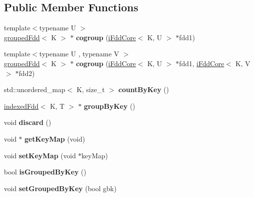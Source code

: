 \subsection*{Public Member Functions}
\begin{DoxyCompactItemize}
\item 
\hypertarget{classfaster_1_1iFddCore_a311cd5a470392a25565057aaf0fa3226}{}{\footnotesize template$<$typename U $>$ }\\\hyperlink{classfaster_1_1groupedFdd}{grouped\+Fdd}$<$ K $>$ $\ast$ {\bfseries cogroup} (\hyperlink{classfaster_1_1iFddCore}{i\+Fdd\+Core}$<$ K, U $>$ $\ast$fdd1)\label{classfaster_1_1iFddCore_a311cd5a470392a25565057aaf0fa3226}

\item 
\hypertarget{classfaster_1_1iFddCore_af434c1c5118e380f9d78398fe46176d5}{}{\footnotesize template$<$typename U , typename V $>$ }\\\hyperlink{classfaster_1_1groupedFdd}{grouped\+Fdd}$<$ K $>$ $\ast$ {\bfseries cogroup} (\hyperlink{classfaster_1_1iFddCore}{i\+Fdd\+Core}$<$ K, U $>$ $\ast$fdd1, \hyperlink{classfaster_1_1iFddCore}{i\+Fdd\+Core}$<$ K, V $>$ $\ast$fdd2)\label{classfaster_1_1iFddCore_af434c1c5118e380f9d78398fe46176d5}

\item 
\hypertarget{classfaster_1_1iFddCore_a4ed897a7b2af2918f91c3f8f89835ed4}{}std\+::unordered\+\_\+map$<$ K, size\+\_\+t $>$ {\bfseries count\+By\+Key} ()\label{classfaster_1_1iFddCore_a4ed897a7b2af2918f91c3f8f89835ed4}

\item 
\hypertarget{classfaster_1_1iFddCore_ac671d250f94c0927152362d4a982e931}{}\hyperlink{classfaster_1_1indexedFdd}{indexed\+Fdd}$<$ K, T $>$ $\ast$ {\bfseries group\+By\+Key} ()\label{classfaster_1_1iFddCore_ac671d250f94c0927152362d4a982e931}

\item 
\hypertarget{classfaster_1_1iFddCore_a9a7002de9ec87e594aa461c1b379b453}{}void {\bfseries discard} ()\label{classfaster_1_1iFddCore_a9a7002de9ec87e594aa461c1b379b453}

\item 
\hypertarget{classfaster_1_1iFddCore_ae98ce87e7349cbed87ff69be57df978e}{}void $\ast$ {\bfseries get\+Key\+Map} (void)\label{classfaster_1_1iFddCore_ae98ce87e7349cbed87ff69be57df978e}

\item 
\hypertarget{classfaster_1_1iFddCore_acf3b47990ef3bb200c7e214e0c82b03e}{}void {\bfseries set\+Key\+Map} (void $\ast$key\+Map)\label{classfaster_1_1iFddCore_acf3b47990ef3bb200c7e214e0c82b03e}

\item 
\hypertarget{classfaster_1_1iFddCore_a85b2607d1cc8f604a3965c313f16b240}{}bool {\bfseries is\+Grouped\+By\+Key} ()\label{classfaster_1_1iFddCore_a85b2607d1cc8f604a3965c313f16b240}

\item 
\hypertarget{classfaster_1_1iFddCore_a37c6f71cc6ce171ccd78120c7103f181}{}void {\bfseries set\+Grouped\+By\+Key} (bool gbk)\label{classfaster_1_1iFddCore_a37c6f71cc6ce171ccd78120c7103f181}

\end{DoxyCompactItemize}
